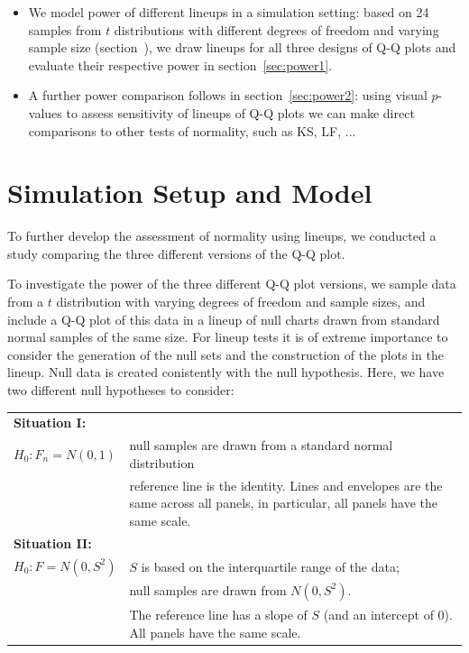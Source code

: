 \documentclass{article}\usepackage[]{graphicx}\usepackage[]{color}
\newcommand{\hh}[1]{{\color{magenta} #1}}
\newcommand{\hhnote}[1]{\todo[inline,color=magenta!40]{#1}}
\begin{document}
\hhnote{Outline of the paper:}
\hh{
\begin{itemize}

\item We model power of different lineups in a simulation setting: based on 24 samples from $t$ distributions with different degrees of freedom and varying sample size (section~\label{sec:simu}), we draw lineups for all three designs of Q-Q plots and evaluate their respective power in section~\ref{sec:power1}. 
\item A further power comparison follows in section~\ref{sec:power2}: using   visual $p$-values to assess sensitivity of lineups of Q-Q plots we can make direct comparisons to other tests of normality, such as KS, LF, ...
\end{itemize}}



\section{Simulation Setup and Model}\label{sec:simu}

To further develop the assessment of normality using lineups, we conducted a study comparing the three different versions of the Q-Q plot.


To investigate the power of the three different Q-Q plot versions, we sample data from a $t$ distribution with varying degrees of freedom and sample sizes, and include a Q-Q plot of this data in a lineup of null charts drawn from standard normal samples of the same size.
For lineup tests it is of extreme importance to consider the generation of the null sets and the construction of the plots in the lineup. 
Null data is created conistently with the null hypothesis. Here, we have two different null hypotheses to consider:

\begin{tabular}{lp{4.75in}}
\multicolumn{2}{l}{\bf Situation I:}\\
$H_0: F_n = N(0,1)$ &  null samples are drawn from a standard normal distribution \\
& reference line is the identity. Lines and envelopes are the same across all panels, in particular, all panels have the same scale. \\[3pt]
\multicolumn{2}{l}{\bf Situation II:}\\
$H_0: F = N(0,S^2)$ & $S$ is based on the interquartile range of the data; \\
& null samples are drawn from $N(0, S^2)$. \\
& The reference line has a slope of $S$ (and an intercept of 0).  All panels have the same scale. 
\end{tabular}
\end{document}
